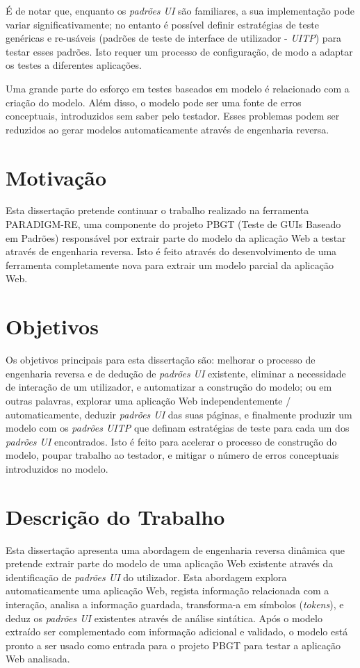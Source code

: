 \documentclass[9pt,a4paper]{extarticle}
\begin{document}
\begin{multicols}{2}
É de notar que, enquanto os \textit{padrões UI} são familiares, a sua implementação pode variar significativamente; no entanto é possível definir estratégias de teste genéricas e re-usáveis (padrões de teste de interface de utilizador - \textit{UITP}) para testar esses padrões. Isto requer um processo de configuração, de modo a adaptar os testes a diferentes aplicações.

Uma grande parte do esforço em testes baseados em modelo é relacionado com a criação do modelo. Além disso, o modelo pode ser uma fonte de erros conceptuais, introduzidos sem saber pelo testador. Esses problemas podem ser reduzidos ao gerar modelos automaticamente através de engenharia reversa.
\section{Motivação}\label{sec:motiva}
Esta dissertação pretende continuar o trabalho realizado na ferramenta PARADIGM-RE, uma componente do projeto PBGT (Teste de GUIs Baseado em Padrões) responsável por extrair parte do modelo da aplicação Web a testar através de engenharia reversa. Isto é feito através do desenvolvimento de uma ferramenta completamente nova para extrair um modelo parcial da aplicação Web.

\section{Objetivos}\label{sec:goals}
Os objetivos principais para esta dissertação são: melhorar o processo de engenharia reversa e de dedução de \textit{padrões UI} existente, eliminar a necessidade de interação de um utilizador, e automatizar a construção do modelo; ou em outras palavras, explorar uma aplicação Web independentemente / automaticamente, deduzir \textit{padrões UI} das suas páginas, e finalmente produzir um modelo com os \textit{padrões UITP} que definam estratégias de teste para cada um dos \textit{padrões UI} encontrados. Isto é feito para acelerar o processo de construção do modelo, poupar trabalho ao testador, e mitigar o número de erros conceptuais introduzidos no modelo.

\section{Descrição do Trabalho}\label{sec:work}
Esta dissertação apresenta uma abordagem de engenharia reversa dinâmica que pretende extrair parte do modelo de uma aplicação Web existente através da identificação de \textit{padrões UI} do utilizador. Esta abordagem explora automaticamente uma aplicação Web, regista informação relacionada com a interação, analisa a informação guardada, transforma-a em símbolos (\textit{tokens}), e deduz os \textit{padrões UI} existentes através de análise sintática. Após o modelo extraído ser complementado com informação adicional e validado, o modelo está pronto a ser usado como entrada para o projeto PBGT para testar a aplicação Web analisada.


\end{multicols}
\end{document}
